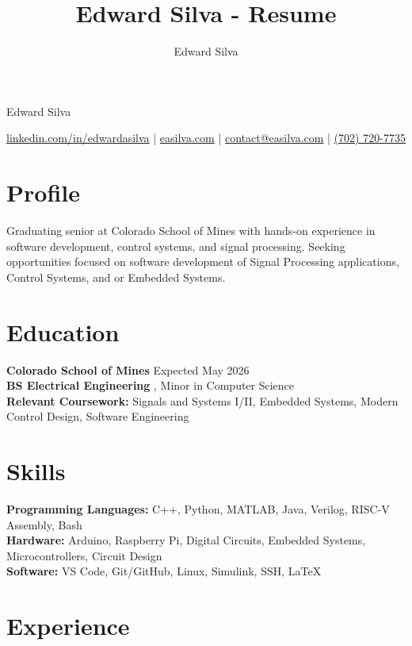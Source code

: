 \documentclass[11pt]{article}
\title{Edward Silva - Resume}
\author{Edward Silva}
\begin{document}
\thispagestyle{empty}

\centerline{\huge Edward Silva}
\vspace{3pt}

\centerline{\href{https://www.linkedin.com/in/edwardasilva}{linkedin.com/in/edwardasilva} | \href{https://easilva.com}{easilva.com} | \href{mailto:contact@easilva.com}{contact@easilva.com} | \href{tel:7027207735}{(702) 720-7735}}

\section*{Profile}

Graduating senior at Colorado School of Mines with hands-on experience in software development, control systems, and signal processing. Seeking opportunities focused on software development of Signal Processing applications, Control Systems, and or Embedded Systems.

\section*{Education}

\textbf{Colorado School of Mines} \hfill Expected May 2026 \\
\textbf{BS Electrical Engineering} , Minor in Computer Science \\



\textbf{Relevant Coursework:} Signals and Systems I/II, Embedded Systems, Modern Control Design, Software Engineering \\

\section*{Skills}

\textbf{Programming Languages:} C++, Python, MATLAB, Java, Verilog, RISC-V Assembly, Bash \\
\textbf{Hardware:} Arduino, Raspberry Pi, Digital Circuits, Embedded Systems, Microcontrollers, Circuit Design \\
\textbf{Software:} VS Code, Git/GitHub, Linux, Simulink, SSH, LaTeX \\

\section*{Experience}
\end{document}
